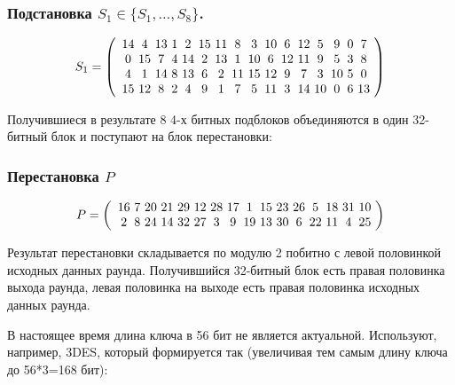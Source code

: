 \begin{frame}
    \frametitle{Подстановка $S_1\in\{S_1,\ldots,S_8\}$.}

    \[
        S_1 =
        \left(
            \begin{array}[c]{c@{\ }c@{\ }c@{\ }c@{\ }c@{\ }c@{\ }c@{\ }c@{\ }c@{\ }c@{\ }c@{\ }c@{\ }c@{\ }c@{\ }c@{\ }c@{\ }}
                14  &4   &13  &1   &2   &15  &11  &8   &3   &10  &6   &12  &5   &9   &0   &7 \\
                0   &15  &7   &4   &14  &2   &13  &1   &10  &6   &12  &11  &9   &5   &3   &8 \\
                4   &1   &14  &8   &13  &6   &2   &11  &15  &12  &9   &7   &3   &10  &5   &0 \\
                15  &12  &8   &2   &4   &9   &1   &7   &5   &11  &3   &14  &10  &0   &6   &13
            \end{array}
        \right)
    \]
\end{frame}

Получившиеся в результате 8 4-х битных подблоков объединяются в один 32-битный блок и поступают на блок перестановки:

\begin{frame}
    \frametitle{Перестановка $P$}

    \[
        P =
        \left(
            \begin{array}[c]{c@{\ }c@{\ }c@{\ }c@{\ }c@{\ }c@{\ }c@{\ }c@{\ }c@{\ }c@{\ }c@{\ }c@{\ }c@{\ }c@{\ }c@{\ }c@{\ }}
                16  &7  &20 &21 &29 &12 &28 &17 &1  &15 &23 &26 &5  &18 &31 &10 \\
                2   &8  &24 &14 &32 &27 &3  &9  &19 &13 &30 &6  &22 &11 &4  &25 \\
            \end{array}
        \right)
    \]
\end{frame}

Результат перестановки складывается по модулю 2 побитно с левой половинкой исходных данных раунда. Получившийся 32-битный блок есть правая половинка выхода раунда, левая половинка на выходе есть правая половинка исходных данных раунда. 

В настоящее время длина ключа в 56 бит не является актуальной. Используют, например, 3DES, который формируется так (увеличивая тем самым длину ключа до 56*3=168 бит):


